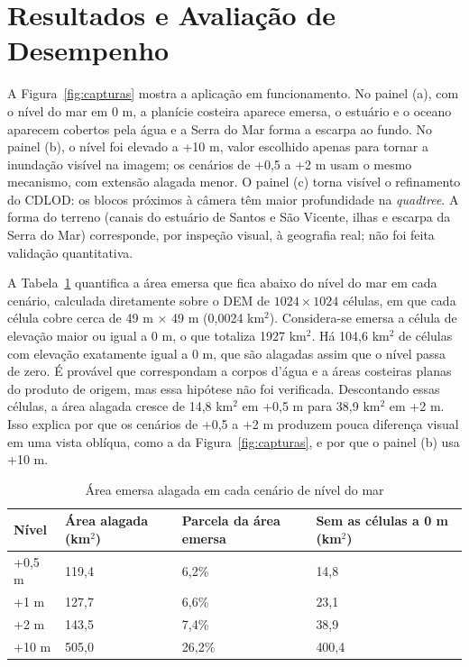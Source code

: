 \documentclass[conference]{IEEEtran}
\newcommand{\fonte}[1]{\par\vspace{2pt}{\footnotesize Fonte: #1\par}}
\begin{document}
\section{Resultados e Avaliação de Desempenho}
\label{sec:resultados}

A Figura~\ref{fig:capturas} mostra a aplicação em funcionamento. No painel
(a), com o nível do mar em 0 m, a planície costeira aparece emersa, o
estuário e o oceano aparecem cobertos pela água e a Serra do Mar forma a
escarpa ao fundo. No painel (b), o nível
foi elevado a +10 m, valor escolhido apenas para tornar a inundação
visível na imagem; os cenários de +0,5 a +2 m usam o mesmo mecanismo, com
extensão alagada menor. O painel (c) torna visível o refinamento do CDLOD:
os blocos próximos à câmera têm maior profundidade na \emph{quadtree}. A forma do terreno (canais do estuário de Santos e São Vicente, ilhas e escarpa da Serra do Mar) corresponde, por inspeção visual, à geografia real; não foi feita validação quantitativa.

A Tabela~\ref{tab:area} quantifica a área emersa que fica abaixo do nível
do mar em cada cenário, calculada diretamente sobre o DEM de $1024 \times
1024$ células, em que cada célula cobre cerca de 49 m $\times$ 49 m
(0,0024 km$^2$). Considera-se emersa a célula de elevação maior ou igual a
0 m, o que totaliza 1927 km$^2$. Há 104,6 km$^2$ de células com elevação
exatamente igual a 0 m, que são alagadas assim que o nível passa de zero.
É provável que correspondam a corpos d'água e a áreas costeiras planas do
produto de origem, mas essa hipótese não foi verificada. Descontando essas
células, a área alagada cresce de 14,8 km$^2$ em +0,5 m para 38,9 km$^2$ em
+2 m. Isso explica por que os cenários de +0,5 a +2 m produzem pouca
diferença visual em uma vista oblíqua, como a da Figura~\ref{fig:capturas},
e por que o painel (b) usa +10 m.

\begin{table}[t]
\caption{Área emersa alagada em cada cenário de nível do mar}
\label{tab:area}
\centering
\begin{tabular}{@{}p{1.3cm}p{1.9cm}p{2.0cm}p{2.3cm}@{}}
\toprule
\textbf{Nível} & \textbf{Área alagada (km$^2$)} & \textbf{Parcela da área emersa} & \textbf{Sem as células a 0 m (km$^2$)} \\
\midrule
+0,5 m & 119,4 & 6,2\% & 14,8 \\
+1 m   & 127,7 & 6,6\% & 23,1 \\
+2 m   & 143,5 & 7,4\% & 38,9 \\
+10 m  & 505,0 & 26,2\% & 400,4 \\
\bottomrule
\end{tabular}
\fonte{Elaborado pelos autores (2026), a partir do DEM de 1024 $\times$ 1024
células. Área emersa: células com elevação maior ou igual a 0 m (1927
km$^2$).}
\end{table}
\end{document}
